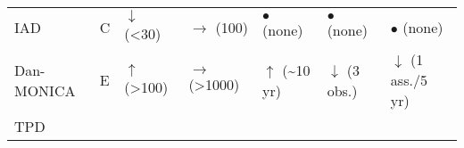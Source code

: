 \documentclass[
]{book}
\begin{document}
\begin{longtable}[]{@{}lllllll@{}}
\begin{minipage}[t]{0.08\columnwidth}\raggedright
IAD\strut
\end{minipage} & \begin{minipage}[t]{0.05\columnwidth}\raggedright
C\strut
\end{minipage} & \begin{minipage}[t]{0.13\columnwidth}\raggedright
\(\downarrow\) (\textless30)\strut
\end{minipage} & \begin{minipage}[t]{0.13\columnwidth}\raggedright
\(\rightarrow\) (100)\strut
\end{minipage} & \begin{minipage}[t]{0.13\columnwidth}\raggedright
\(\bullet\) (none)\strut
\end{minipage} & \begin{minipage}[t]{0.13\columnwidth}\raggedright
\(\bullet\) (none)\strut
\end{minipage} & \begin{minipage}[t]{0.13\columnwidth}\raggedright
\(\bullet\) (none)\strut
\end{minipage}\tabularnewline
\begin{minipage}[t]{0.08\columnwidth}\raggedright
Dan-MONICA\strut
\end{minipage} & \begin{minipage}[t]{0.05\columnwidth}\raggedright
E\strut
\end{minipage} & \begin{minipage}[t]{0.13\columnwidth}\raggedright
\(\uparrow\) (\textgreater100)\strut
\end{minipage} & \begin{minipage}[t]{0.13\columnwidth}\raggedright
\(\rightarrow\) (\textgreater1000)\strut
\end{minipage} & \begin{minipage}[t]{0.13\columnwidth}\raggedright
\(\uparrow\) (\textasciitilde10 yr)\strut
\end{minipage} & \begin{minipage}[t]{0.13\columnwidth}\raggedright
\(\downarrow\) (3 obs.)\strut
\end{minipage} & \begin{minipage}[t]{0.13\columnwidth}\raggedright
\(\downarrow\) (1 ass./5 yr)\strut
\end{minipage}\tabularnewline
\begin{minipage}[t]{0.08\columnwidth}\raggedright
TPD\strut
\end{minipage} & \begin{minipage}[t]{0.05\columnwidth}\raggedright

\end{minipage}
\end{longtable}
\end{document}
